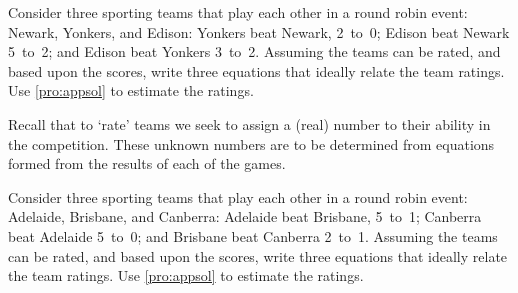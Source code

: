 
\begin{exercise}  
Consider three sporting teams that play each other in a round robin  event: Newark, Yonkers, and Edison:
Yonkers beat Newark, 2~to~0;
Edison beat Newark 5~to~2; and
Edison beat Yonkers 3~to~2.
Assuming the teams can be rated, and  based upon the scores, write three equations that ideally relate the team ratings.  
Use \autoref{pro:appsol} to estimate the ratings.

Recall that to `rate' teams we seek to assign a (real) number to their ability in the competition.  These unknown numbers are to be determined from equations formed from the results of each of the games.
\end{exercise}



\begin{reduce}
\begin{exercise}  
Consider three sporting teams that play each other in a round robin  event: Adelaide, Brisbane, and Canberra:
Adelaide beat Brisbane, 5~to~1;
Canberra beat Adelaide 5~to~0; and
Brisbane beat Canberra 2~to~1.
Assuming the teams can be rated, and  based upon the scores, write three equations that ideally relate the team ratings.  
Use \autoref{pro:appsol} to estimate the ratings.
\end{exercise}
\end{reduce}



